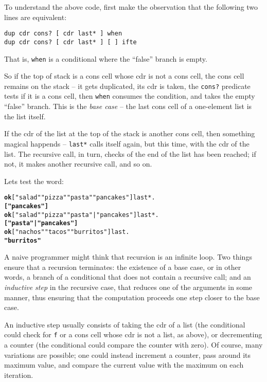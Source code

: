 \documentclass[english]{book}
\begin{document}
To understand the above code, first make the observation that the following two lines are equivalent:

\begin{verbatim}
dup cdr cons? [ cdr last* ] when
dup cdr cons? [ cdr last* ] [ ] ifte
\end{verbatim}

That is, \texttt{when} is a conditional where the ``false'' branch is empty.

So if the top of stack is a cons cell whose cdr is not a cons cell, the cons cell remains on the stack -- it gets duplicated, its cdr is taken, the \texttt{cons?} predicate tests if it is a cons cell, then \texttt{when} consumes the condition, and takes the empty ``false'' branch. This is the \emph{base case} -- the last cons cell of a one-element list is the list itself.

If the cdr of the list at the top of the stack is another cons cell, then something magical happends -- \texttt{last*} calls itself again, but this time, with the cdr of the list. The recursive call, in turn, checks of the end of the list has been reached; if not, it makes another recursive call, and so on.

Lets test the word:

\begin{alltt}
\textbf{ok} {[} "salad" "pizza" "pasta" "pancakes" {]} last* .
\textbf{{[} "pancakes" {]}}
\textbf{ok} {[} "salad" "pizza" "pasta" | "pancakes" {]} last* .
\textbf{{[} "pasta" | "pancakes" {]}}
\textbf{ok} {[} "nachos" "tacos" "burritos" {]} last .
\textbf{"burritos"}
\end{alltt}

A naive programmer might think that recursion is an infinite loop. Two things ensure that a recursion terminates: the existence of a base case, or in other words, a branch of a conditional that does not contain a recursive call; and an \emph{inductive step} in the recursive case, that reduces one of the arguments in some manner, thus ensuring that the computation proceeds one step closer to the base case.

An inductive step usually consists of taking the cdr of a list (the conditional could check for \texttt{f} or a cons cell whose cdr is not a list, as above), or decrementing a counter (the conditional could compare the counter with zero). Of course, many variations are possible; one could instead increment a counter, pass around its maximum value, and compare the current value with the maximum on each iteration.
\end{document}

